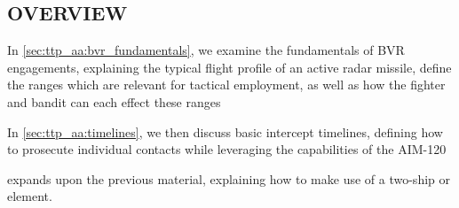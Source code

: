 \clearpage

\subsection{OVERVIEW}
\begin{tcoloritemize}
    \blueitem[Fundamentals] 
    In \cref{sec:ttp_aa:bvr_fundamentals}, 
    we examine the fundamentals of BVR engagements, 
    explaining the typical flight profile of an active radar missile,
    define the ranges which are relevant for tactical employment,
    as well as how the fighter and bandit can each effect these ranges

    In \cref{sec:ttp_aa:timelines}, 
    we then discuss basic intercept timelines, 
    defining how to prosecute individual contacts while leveraging the capabilities of the AIM-120

     expands upon the previous material, 
    explaining how to make use of a two-ship or element.

\end{tcoloritemize}

\clearpage